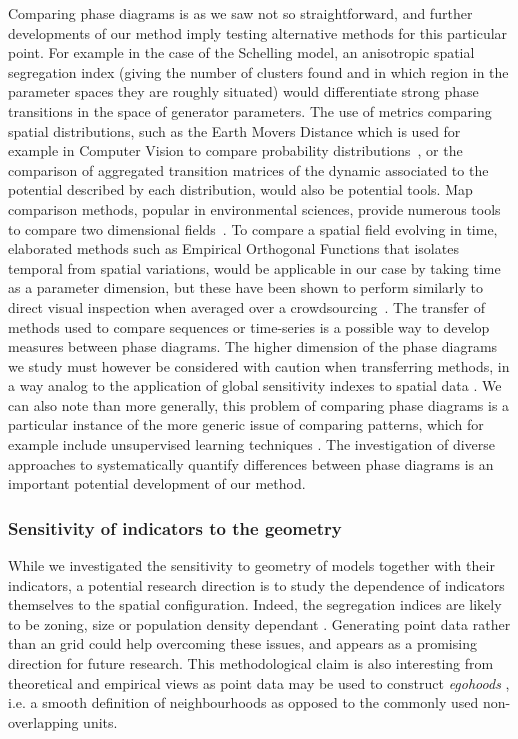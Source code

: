 \documentclass{JASSS}
\begin{document}
Comparing phase diagrams is as we saw not so straightforward, and further developments of our method imply testing alternative methods for this particular point. For example in the case of the Schelling model, an anisotropic spatial segregation index (giving the number of clusters found and in which region in the parameter spaces they are roughly situated) would differentiate strong phase transitions in the space of generator parameters. The use of metrics comparing spatial distributions, such as the Earth Movers Distance which is used for example in Computer Vision to compare probability distributions~\citep{rubner2000earth}, or the comparison of aggregated transition matrices of the dynamic associated to the potential described by each distribution, would also be potential tools. Map comparison methods, popular in environmental sciences, provide numerous tools to compare two dimensional fields~\citep{visser2006map,kuhnert2005comparing}. To compare a spatial field evolving in time, elaborated methods such as Empirical Orthogonal Functions that isolates temporal from spatial variations, would be applicable in our case by taking time as a parameter dimension, but these have been shown to perform similarly to direct visual inspection when averaged over a crowdsourcing~\citep{10.1371/journal.pone.0178165}. The transfer of methods used to compare sequences \citep{kruskal1983overview} or time-series \citep{liao2005clustering} is a possible way to develop measures between phase diagrams. The higher dimension of the phase diagrams we study must however be considered with caution when transferring methods, in a way analog to the application of global sensitivity indexes to spatial data \citep{lilburne2009sensitivity}. We can also note than more generally, this problem of comparing phase diagrams is a particular instance of the more generic issue of comparing patterns, which for example include unsupervised learning techniques \citep{hastie2009unsupervised}. The investigation of diverse approaches to systematically quantify differences between phase diagrams is an important potential development of our method.

\subsubsection{Sensitivity of indicators to the geometry}

While we investigated the sensitivity to geometry of models together with their indicators, a potential research direction is to study the dependence of indicators themselves to the spatial configuration. Indeed, the segregation indices are likely to be zoning, size or population density dependant \citep{Wong1997,ReardonOSullivan2004}. Generating point data rather than an grid could help overcoming these issues, and appears as a promising direction for future research. This methodological claim is also interesting from theoretical and empirical views as point data may be used to construct \textit{egohoods} \citep{Hippetal2013}, i.e. a smooth definition of neighbourhoods as opposed to the commonly used non-overlapping units. 
\end{document}
